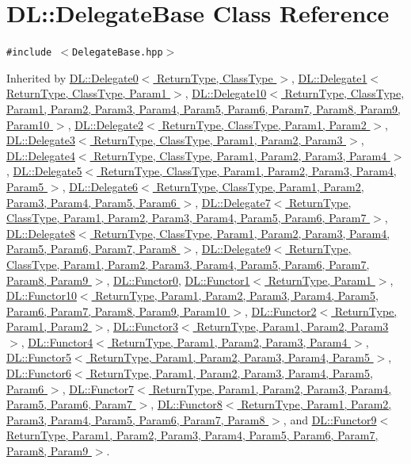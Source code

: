 \hypertarget{classDL_1_1DelegateBase}{
\section{DL::Delegate\-Base Class Reference}
\label{classDL_1_1DelegateBase}
}
{\tt \#include $<$Delegate\-Base.hpp$>$}

Inherited by \hyperlink{classDL_1_1Delegate0}{DL::Delegate0$<$ Return\-Type, Class\-Type $>$}, \hyperlink{classDL_1_1Delegate1}{DL::Delegate1$<$ Return\-Type, Class\-Type, Param1 $>$}, \hyperlink{classDL_1_1Delegate10}{DL::Delegate10$<$ Return\-Type, Class\-Type, Param1, Param2, Param3, Param4, Param5, Param6, Param7, Param8, Param9, Param10 $>$}, \hyperlink{classDL_1_1Delegate2}{DL::Delegate2$<$ Return\-Type, Class\-Type, Param1, Param2 $>$}, \hyperlink{classDL_1_1Delegate3}{DL::Delegate3$<$ Return\-Type, Class\-Type, Param1, Param2, Param3 $>$}, \hyperlink{classDL_1_1Delegate4}{DL::Delegate4$<$ Return\-Type, Class\-Type, Param1, Param2, Param3, Param4 $>$}, \hyperlink{classDL_1_1Delegate5}{DL::Delegate5$<$ Return\-Type, Class\-Type, Param1, Param2, Param3, Param4, Param5 $>$}, \hyperlink{classDL_1_1Delegate6}{DL::Delegate6$<$ Return\-Type, Class\-Type, Param1, Param2, Param3, Param4, Param5, Param6 $>$}, \hyperlink{classDL_1_1Delegate7}{DL::Delegate7$<$ Return\-Type, Class\-Type, Param1, Param2, Param3, Param4, Param5, Param6, Param7 $>$}, \hyperlink{classDL_1_1Delegate8}{DL::Delegate8$<$ Return\-Type, Class\-Type, Param1, Param2, Param3, Param4, Param5, Param6, Param7, Param8 $>$}, \hyperlink{classDL_1_1Delegate9}{DL::Delegate9$<$ Return\-Type, Class\-Type, Param1, Param2, Param3, Param4, Param5, Param6, Param7, Param8, Param9 $>$}, \hyperlink{classDL_1_1Functor0}{DL::Functor0}, \hyperlink{classDL_1_1Functor1}{DL::Functor1$<$ Return\-Type, Param1 $>$}, \hyperlink{classDL_1_1Functor10}{DL::Functor10$<$ Return\-Type, Param1, Param2, Param3, Param4, Param5, Param6, Param7, Param8, Param9, Param10 $>$}, \hyperlink{classDL_1_1Functor2}{DL::Functor2$<$ Return\-Type, Param1, Param2 $>$}, \hyperlink{classDL_1_1Functor3}{DL::Functor3$<$ Return\-Type, Param1, Param2, Param3 $>$}, \hyperlink{classDL_1_1Functor4}{DL::Functor4$<$ Return\-Type, Param1, Param2, Param3, Param4 $>$}, \hyperlink{classDL_1_1Functor5}{DL::Functor5$<$ Return\-Type, Param1, Param2, Param3, Param4, Param5 $>$}, \hyperlink{classDL_1_1Functor6}{DL::Functor6$<$ Return\-Type, Param1, Param2, Param3, Param4, Param5, Param6 $>$}, \hyperlink{classDL_1_1Functor7}{DL::Functor7$<$ Return\-Type, Param1, Param2, Param3, Param4, Param5, Param6, Param7 $>$}, \hyperlink{classDL_1_1Functor8}{DL::Functor8$<$ Return\-Type, Param1, Param2, Param3, Param4, Param5, Param6, Param7, Param8 $>$}, and \hyperlink{classDL_1_1Functor9}{DL::Functor9$<$ Return\-Type, Param1, Param2, Param3, Param4, Param5, Param6, Param7, Param8, Param9 $>$}.

